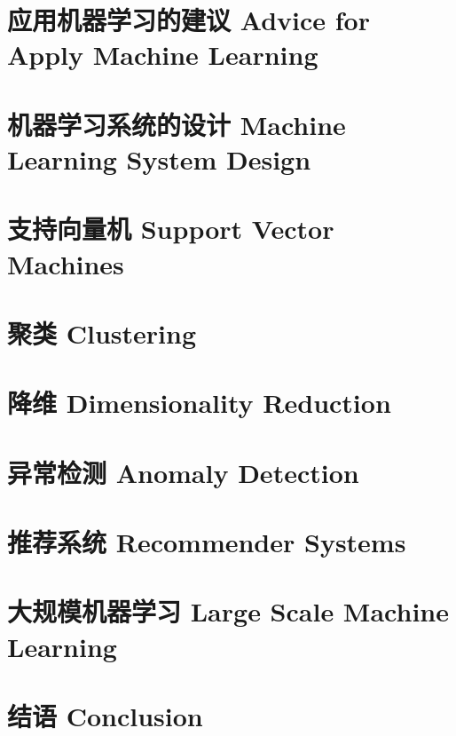 \documentclass[12pt, a4paper]{article}
\begin{document}
    \section{应用机器学习的建议 Advice for Apply Machine Learning}

    \section{机器学习系统的设计 Machine Learning System Design}

    \section{支持向量机 Support Vector Machines}

    \section{聚类 Clustering}

    \section{降维 Dimensionality Reduction}

    \section{异常检测 Anomaly Detection}

    \section{推荐系统 Recommender Systems}

    \section{大规模机器学习 Large Scale Machine Learning}

    \section{结语 Conclusion}
\end{document}
